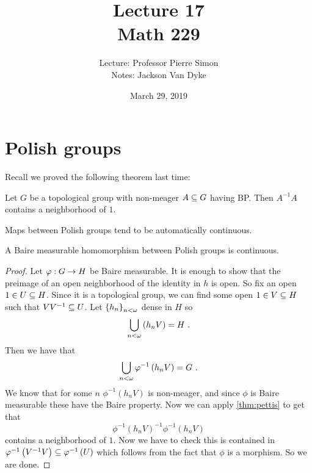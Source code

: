 \documentclass{amsart}
\begin{document}
\title{Lecture 17\\Math 229}
\date{March 29, 2019}
\author{Lecture: Professor Pierre Simon\\Notes: Jackson Van Dyke}
\maketitle

\section{Polish groups}

Recall we proved the following theorem last time:

\begin{thm}[Pettis]
Let $G$ be a topological group with non-meager
$A\subseteq G$ having BP.
Then $A^{-1}A$ contains a neighborhood of $1$.
\label{thm:pettis}
\end{thm}

Maps between Polish groups tend to be automatically continuous.

\begin{cor}
A Baire measurable homomorphism between Polish groups is continuous.
\end{cor}

\begin{proof}
Let $\varphi:G\rightarrow H$ be Baire measurable. It is enough to show that the preimage of an
open neighborhood of the identity in $h$ is open. So fix an open $1\in U\subseteq H$.
Since it is a topological group, we can find some open $1\in V\subseteq H$ such that $VV^{-1}
\subseteq U$. Let $\left\{ h_n \right\}_{n<\omega}$ dense in $H$ so
\begin{equation}
\bigcup_{n < \omega}\left( h_n V \right) = H \ .
\end{equation}
Then we have that
\begin{equation}
\bigcup_{n < \omega} \varphi^{-1} \left( h_n V \right) = G  \ .
\end{equation}
We know that for some $n$ $\phi^{-1}\left( h_n V \right)$ is non-meager, and
since $\phi$ is Baire measurable these have the Baire property.
Now we can apply \cref{thm:pettis} to get that 
\begin{equation}
\phi^{-1}\left( h_n V \right)^{-1} \phi^{-1}\left( h_n V \right)
\end{equation}
contains a neighborhood of $1$. Now we have to check this is contained in $\varphi^{-1}\left(
V^{-1} V \right) \subseteq \varphi^{-1}\left( U \right)$
which follows from the fact that $\phi$ is a morphism. 
So we are done.
\end{proof}
\end{document}
